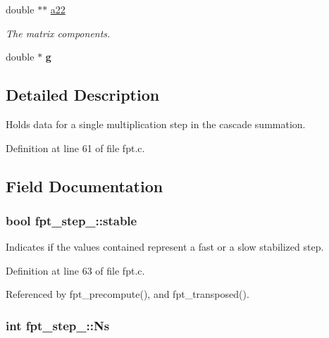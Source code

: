 \begin{DoxyCompactItemize}
\item 
\hypertarget{structfpt__step___a671d73e56c51c3c8daaa9678da341ce9}{double $\ast$$\ast$ \hyperlink{structfpt__step___a671d73e56c51c3c8daaa9678da341ce9}{a22}}\label{structfpt__step___a671d73e56c51c3c8daaa9678da341ce9}

\begin{DoxyCompactList}\small\item\em The matrix components. \end{DoxyCompactList}\item 
\hypertarget{structfpt__step___affc3fb53919156a934a28c6350f7f540}{double $\ast$ {\bfseries g}}\label{structfpt__step___affc3fb53919156a934a28c6350f7f540}

\end{DoxyCompactItemize}


\subsection{Detailed Description}
Holds data for a single multiplication step in the cascade summation. 

Definition at line 61 of file fpt.\-c.



\subsection{Field Documentation}
\hypertarget{structfpt__step___a71dc6483b4f3b958519bdafeae2c1dbf}{
\subsubsection[{stable}]{\setlength{\rightskip}{0pt plus 5cm}bool fpt\-\_\-step\-\_\-\-::stable}}\label{structfpt__step___a71dc6483b4f3b958519bdafeae2c1dbf}


Indicates if the values contained represent a fast or a slow stabilized step. 



Definition at line 63 of file fpt.\-c.



Referenced by fpt\-\_\-precompute(), and fpt\-\_\-transposed().

\hypertarget{structfpt__step___ac6767b7c6935b1f2af5dd54e2e8f690b}{
\subsubsection[{Ns}]{\setlength{\rightskip}{0pt plus 5cm}int fpt\-\_\-step\-\_\-\-::\-Ns}}\label{structfpt__step___ac6767b7c6935b1f2af5dd54e2e8f690b}


